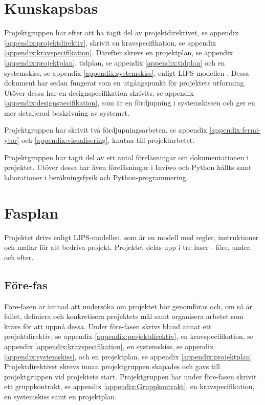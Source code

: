 \documentclass[a4paper,12pt,twoside,openright]{report}
\begin{document}
\section{Kunskapsbas}
\label{ch:kunskapsbas}
Projektgruppen har efter att ha tagit del av projektdirektivet, se appendix \ref{appendix:projektdirektiv},
skrivit en kravspecifikation, se appendix \ref{appendix:kravspecifikation}. Därefter skrevs en projektplan, se appendix \ref{appendix:projektplan}, tidplan, se appendix \ref{appendix:tidplan} och en  systemskiss, se appendix \ref{appendix:systemskiss}, enligt LIPS-modellen \cite{LIPS}. 
Dessa dokument har sedan fungerat som en utgångspunkt för projektets utforming. Utöver dessa har en designspecifikation skrivits, se appendix \ref{appendix:designspecifikation}, som är en fördjupning i systemskissen och ger en mer detaljerad beskrivning av systemet.

Projektgruppen har skrivit två fördjupningsarbeten, se appendix \ref{appendix:fermi-ytor} och \ref{appendix:visualisering}, knutna till projektarbetet.

Projektgruppen har tagit del av ett antal föreläsningar om dokumentationen i projektet. Utöver dessa har även föreläsningar i Inviwo och Python hållts samt laborationer i beräkningsfysik och Python-programmering. 

\section{Fasplan}
\label{ch:fasplan}
Projektet drivs enligt LIPS-modellen, som är en modell med regler, instruktioner och mallar för att bedriva projekt. Projektet delas upp i tre faser - före, under, och efter.

\subsection{Före-fas}
Före-fasen är ämnad att undersöka om projektet bör genomföras och, om så är fallet, definiera och konkretisera projektets mål samt organisera arbetet som krävs för att uppnå dessa. Under före-fasen skrivs bland annat ett projektdirektiv, se appendix \ref{appendix:projektdirektiv}, en kravspecifikation, se appendix \ref{appendix:kravspecifikation}, en systemskiss, se appendix \ref{appendix:systemskiss}, och en projektplan, se appendix \ref{appendix:projektplan}. Projektdirektivet skrevs innan projektgruppen skapades och gavs till projektgruppen vid projektets start.
Projektgruppen har under före-fasen skrivit ett gruppkontrakt, se appendix \ref{appendix:Gruppkontrakt}, en kravspecifikation, en systemskiss samt en projektplan.
\end{document}
